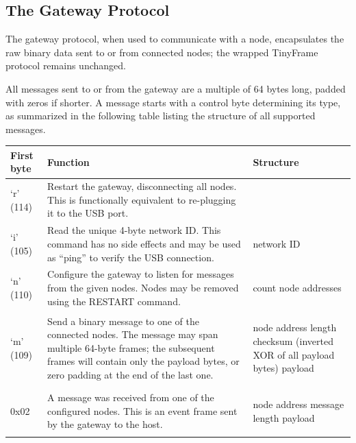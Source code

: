 \subsection{The Gateway Protocol} \label{sec:gw_protocol}

The gateway protocol, when used to communicate with a node, encapsulates the raw binary data sent to or from connected nodes; the wrapped TinyFrame protocol remains unchanged.

All messages sent to or from the gateway are a multiple of 64 bytes long, padded with zeros if shorter. A message starts with a control byte determining its type, as summarized in the following table listing the structure of all supported messages.

\newpage
{
\tabulinesep=5pt
\begin{longtabu} to 
	\toprule
	\textbf{First byte} & \textbf{Function} & \textbf{Structure} \\
	\midrule
	\endhead

	\bottomrule
	\endfoot

	`r' (114) &
	Restart the gateway, disconnecting all nodes. This is functionally equivalent to re-plugging it to the USB port.
	& \\

	`i' (105) &
	Read the unique 4-byte network ID. This command has no side effects and may be used as ``ping'' to verify the USB connection. &
	\begin{cmdresp}
		 network ID
	\end{cmdresp}
	\\

	`n' (110) &
	Configure the gateway to listen for messages from the given nodes.
	Nodes may be removed using the RESTART command.
	&
	\begin{cmdreq}
		 count
		 node addresses
	\end{cmdreq}
	\\

	`m' (109)&
	\cname{SEND\_MSG}
	Send a binary message to one of the connected nodes. The message may span multiple 64-byte frames; the subsequent frames will contain only the payload bytes, or zero padding at the end of the last one.
	& \begin{cmdreq}
		 node address
		 length
		 checksum (inverted XOR of all payload bytes)
		 payload
	\end{cmdreq} \\

	0x02 &
	A message was received from one of the configured nodes. This is an event frame sent by the gateway to the host.
	& \begin{cmdpld}
		 node address
		 message length
		 payload
	\end{cmdpld} \\

\end{longtabu}
}

